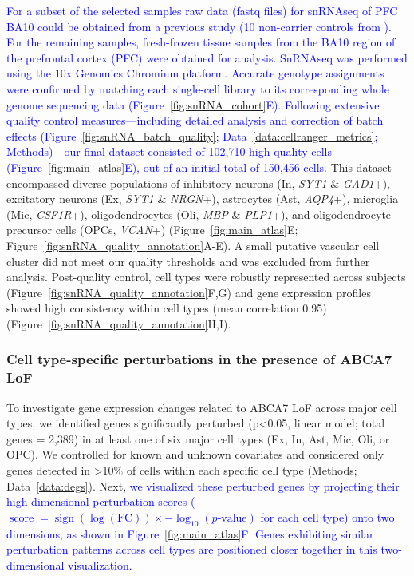 \newcommand{\quoteE}{\textcolor{blue}{For a subset of the selected samples raw data (fastq files) for snRNAseq of PFC BA10 could be obtained from a previous study (10 non-carrier controls from \cite{Mathys2019-wb}). For the remaining samples, fresh-frozen tissue samples from the BA10 region of the prefrontal cortex (PFC) were obtained for analysis. SnRNAseq was performed using the 10x Genomics Chromium platform. Accurate genotype assignments were confirmed by matching each single-cell library to its corresponding whole genome sequencing data (Figure~\ref{fig:snRNA_cohort}E). Following extensive quality control measures—including detailed analysis and correction of batch effects (Figure~\ref{fig:snRNA_batch_quality}; Data~\ref{data:cellranger_metrics}; Methods)—our final dataset consisted of 102,710 high-quality cells (Figure~\ref{fig:main_atlas}E), out of an initial total of 150,456 cells. \label{quoteE-label}}}
\quoteE This dataset encompassed diverse populations of inhibitory neurons (In, \textit{SYT1} \& \textit{GAD1}+), excitatory neurons (Ex, \textit{SYT1} \& \textit{NRGN}+), astrocytes (Ast, \textit{AQP4}+), microglia (Mic, \textit{CSF1R}+), oligodendrocytes (Oli, \textit{MBP} \& \textit{PLP1}+), and oligodendrocyte precursor cells (OPCs, \textit{VCAN}+) (Figure~\ref{fig:main_atlas}E; Figure~\ref{fig:snRNA_quality_annotation}A-E). A small putative vascular cell cluster did not meet our quality thresholds and was excluded from further analysis. Post-quality control, cell types were robustly represented across subjects (Figure~\ref{fig:snRNA_quality_annotation}F,G) and gene expression profiles showed high consistency within cell types (mean correlation 0.95) (Figure~\ref{fig:snRNA_quality_annotation}H,I).

\subsubsection{Cell type-specific perturbations in the presence of ABCA7 LoF}
To investigate gene expression changes related to ABCA7 LoF across major cell types, we identified genes significantly perturbed (p<0.05, linear model; total genes = 2,389) in at least one of six major cell types (Ex, In, Ast, Mic, Oli, or OPC). We controlled for known and unknown covariates and considered only genes detected in >10\% of cells within each specific cell type (Methods; Data~\ref{data:degs}). Next, \newcommand{\quoteF}{\textcolor{blue}{we visualized these perturbed genes by projecting their high-dimensional perturbation scores ($\operatorname{score} = \operatorname{sign}(\log(\text{FC})) \times -\log_{10}(p\text{-value})$ for each cell type) onto two dimensions, as shown in Figure~\ref{fig:main_atlas}F. Genes exhibiting similar perturbation patterns across cell types are positioned closer together in this two-dimensional visualization.\label{quoteF-label}}}\quoteF

